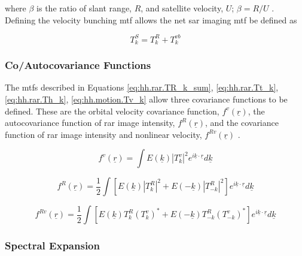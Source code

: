 where $\beta$ is the ratio of slant range, $R$, and satellite velocity, $U$; $\beta = R/U$ \cite{Hasselmann1991}. Defining the velocity bunching \acs{mtf} allows the net \acs{sar} imaging \acs{mtf} \cite{Hasselmann1991}be defined as

\begin{equation} \label{eq:hh.motion.TS_k}
    T^{S}_k = T^R_k +  T^{vb}_k
\end{equation}

\subsubsection{Co/Autocovariance Functions} \label{subsubsec:theory.hasselmann.sarImaging.autocovarFunc}

The \acp{mtf} described in Equations \ref{eq:hh.rar.TR_k_sum}, \ref{eq:hh.rar.Tt_k}, \ref{eq:hh.rar.Th_k}, \ref{eq:hh.motion.Tv_k} allow three covariance functions to be defined. These are the orbital velocity covariance function, $f^v(\underline{r})$, the autocovariance function of \ac{rar} image intensity, $f^R(\underline{r})$, and the covariance function of \ac{rar} image intensity and nonlinear velocity, $f^{Rv}(\underline{r})$ \cite{Hasselmann1991}.

\begin{equation} \label{eq:hh.var.fv}
    f^v(\underline{r}) = \int E(\underline{k}) \left | T^v_k \right |^2 e^{i\underline{k}\cdot \underline{r}} d\underline{k}
\end{equation}

\begin{equation} \label{eq:hh.var.fR}
    f^R(\underline{r}) = \frac{1}{2}\int\left [ E(\underline{k}) \left | T^R_k \right |^2  + E(-\underline{k}) \left | T^R_{-k} \right |^2\right ] e^{i\underline{k}\cdot \underline{r}} d\underline{k}
\end{equation}

\begin{equation} \label{eq:hh.var.fRv}
    f^{Rv}(\underline{r}) = \frac{1}{2}\int\left [ E(\underline{k}) T^R_k (T^v_k)^* + E(-\underline{k}) T^R_{-k} (T^v_{-k})^*\right ] e^{i\underline{k}\cdot \underline{r}} d\underline{k}
\end{equation}

\subsubsection{Spectral Expansion} \label{subsubsec:theory.hasselmann.sarImaging.spectralExpansion}

